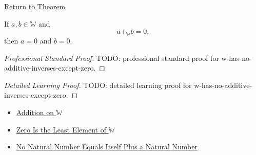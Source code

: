 \newpage
{}
\label{prf:w-has-no-additive-inverses-except-zero}

\begin{remark*}[Return]
\hyperref[thm:w-has-no-additive-inverses-except-zero]{Return to Theorem}
\end{remark*}

\begin{theorem*}
If $a,b\in\mathbb{W}$ and
\[
a+_{\mathbb{W}}b=0,
\]
then $a=0$ and $b=0$.
\end{theorem*}

\begin{proof}[Professional Standard Proof]
\LRAProofBodyStart
TODO: professional standard proof for w-has-no-additive-inverses-except-zero.
\end{proof}

\begin{proof}[Detailed Learning Proof]
\LRAProofBodyStart
TODO: detailed learning proof for w-has-no-additive-inverses-except-zero.
\end{proof}

\begin{remark*}
\end{remark*}

\begin{dependencies}
\begin{itemize}
  \item \hyperref[def:addition-on-w]{Addition on $\mathbb{W}$}
  \item \hyperref[thm:zero-least-element-of-w]{Zero Is the Least Element of $\mathbb{W}$}
  \item \hyperref[thm:no-natural-number-equals-itself-plus-a-natural-number]{No Natural Number Equals Itself Plus a Natural Number}
\end{itemize}
\end{dependencies}

\clearpage
